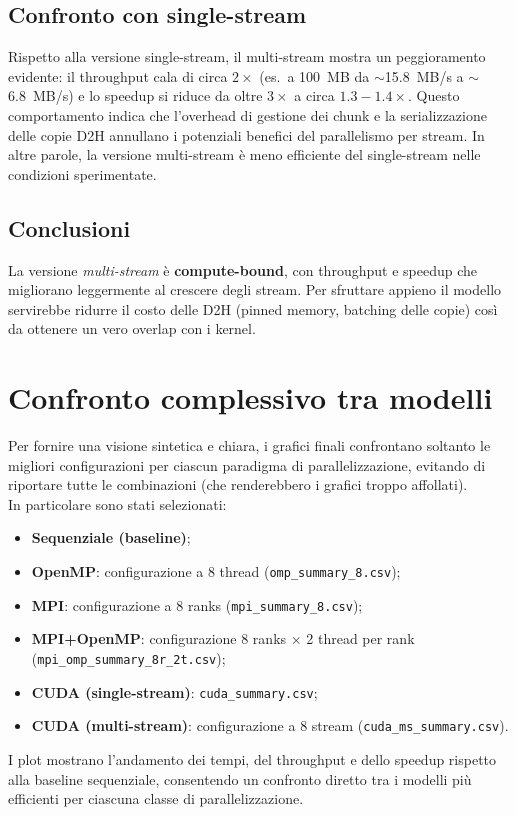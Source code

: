 		\subsection{Confronto con single-stream}
			Rispetto alla versione single-stream, il multi-stream mostra un peggioramento evidente:
			il throughput cala di circa $2\times$ (es.\ a 100~MB da $\sim$15.8~MB/s a $\sim$6.8~MB/s)
			e lo speedup si riduce da oltre $3\times$ a circa $1.3{-}1.4\times$.
			Questo comportamento indica che l’overhead di gestione dei chunk e la serializzazione
			delle copie D2H annullano i potenziali benefici del parallelismo per stream.
			In altre parole, la versione multi-stream è meno efficiente del single-stream
			nelle condizioni sperimentate.
		
		\subsection{Conclusioni}
			La versione \emph{multi-stream} è \textbf{compute-bound}, con throughput e speedup che migliorano leggermente al crescere degli stream.
			Per sfruttare appieno il modello servirebbe ridurre il costo delle D2H (pinned memory, batching delle copie) così da ottenere un vero overlap con i kernel.
	
	\section{Confronto complessivo tra modelli}
		Per fornire una visione sintetica e chiara, i grafici finali confrontano soltanto le migliori configurazioni per ciascun paradigma di parallelizzazione, evitando di riportare tutte le combinazioni (che renderebbero i grafici troppo affollati). \\
		In particolare sono stati selezionati:
		\begin{itemize}
			\item \textbf{Sequenziale (baseline)};
			\item \textbf{OpenMP}: configurazione a 8 thread (\texttt{omp\_summary\_8.csv});
			\item \textbf{MPI}: configurazione a 8 ranks (\texttt{mpi\_summary\_8.csv});
			\item \textbf{MPI+OpenMP}: configurazione 8 ranks $\times$ 2 thread per rank (\texttt{mpi\_omp\_summary\_8r\_2t.csv});
			\item \textbf{CUDA (single-stream)}: \texttt{cuda\_summary.csv};
			\item \textbf{CUDA (multi-stream)}: configurazione a 8 stream (\texttt{cuda\_ms\_summary.csv}).
		\end{itemize}
		I plot mostrano l’andamento dei tempi, del throughput e dello speedup rispetto alla baseline sequenziale, consentendo un confronto diretto tra i modelli più efficienti per ciascuna classe di parallelizzazione.
		
